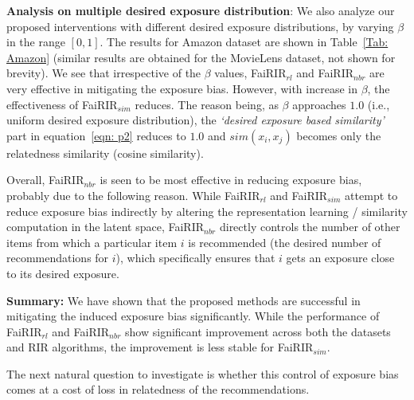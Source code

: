 \noindent
\textbf{Analysis on multiple desired exposure distribution}: We also analyze our proposed interventions with different desired exposure distributions, by varying $\beta$ in the range $[0,1]$. The results for Amazon dataset are shown in Table~\ref{Tab: Amazon} (similar results are obtained for the MovieLens dataset, not shown for brevity). We see that irrespective of the $\beta$ values, FaiRIR$_{rl}$ and FaiRIR$_{nbr}$ are very effective in mitigating the exposure bias. However, with increase in $\beta$, the effectiveness of FaiRIR$_{sim}$ reduces. %
The reason being, as $\beta$ approaches $1.0$ (i.e., uniform desired exposure distribution), the \textit{`desired exposure based similarity'} part in equation~\ref{eqn: p2} reduces to $1.0$ and $sim(x_i, x_j)$ becomes only the relatedness similarity (cosine similarity).

Overall, FaiRIR$_{nbr}$ is seen to be most effective in reducing exposure bias, probably due to the following reason. 
While FaiRIR$_{rl}$ and FaiRIR$_{sim}$ attempt to reduce exposure bias indirectly by altering the representation learning / similarity computation in the latent space, FaiRIR$_{nbr}$ directly controls the number of other items from which a particular item $i$ is recommended (the desired number of recommendations for $i$), which specifically ensures that $i$ gets an exposure close to its desired exposure.

\noindent
\textbf{Summary:} We have shown that the proposed methods %
are successful in mitigating the induced exposure bias significantly. While the performance of  FaiRIR$_{rl}$ and FaiRIR$_{nbr}$ show significant improvement across both the datasets and RIR algorithms, the improvement is less stable for FaiRIR$_{sim}$.


The next natural question to investigate is whether this control of exposure bias comes at a cost of loss in relatedness of the recommendations.


